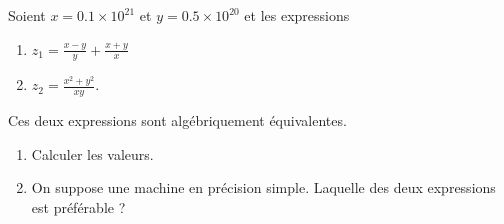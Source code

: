 
\begin{exercice}\label{exomazhe-0003}

    Soient \( x=0.1\times 10^{21}\) et \( y=0.5\times 10^20\) et les expressions 
    \begin{enumerate}
        \item
            \( z_1=\frac{ x-y }{ y }+\frac{ x+y }{ x }\)
        \item
            \( z_2=\frac{ x^2+y^2 }{ xy }\).
    \end{enumerate}
    Ces deux expressions sont algébriquement équivalentes.
    
    \begin{enumerate}
        \item
            Calculer les valeurs.
        \item
            On suppose une machine en précision simple. Laquelle des deux expressions est préférable ?
    \end{enumerate}

\end{exercice}
